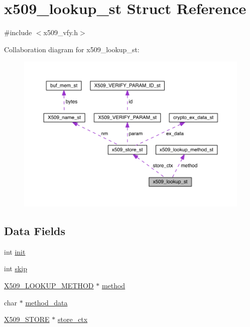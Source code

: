 \hypertarget{structx509__lookup__st}{}\section{x509\+\_\+lookup\+\_\+st Struct Reference}
\label{structx509__lookup__st}


{\ttfamily \#include $<$x509\+\_\+vfy.\+h$>$}



Collaboration diagram for x509\+\_\+lookup\+\_\+st\+:\nopagebreak
\begin{figure}[H]
\begin{center}
\leavevmode
\includegraphics[width=350pt]{structx509__lookup__st__coll__graph}
\end{center}
\end{figure}
\subsection*{Data Fields}
\begin{DoxyCompactItemize}
\item 
int \hyperlink{structx509__lookup__st_a795ea50921b36311ffd5e7baa2ef1f7e}{init}
\item 
int \hyperlink{structx509__lookup__st_a13f77b252237844d7b8b6e3c3047fe50}{skip}
\item 
\hyperlink{crypto_2x509_2x509__vfy_8h_a795687b9a64050138f299d19013fe29d}{X509\+\_\+\+L\+O\+O\+K\+U\+P\+\_\+\+M\+E\+T\+H\+OD} $\ast$ \hyperlink{structx509__lookup__st_a95febc2187ab802f9765b96d200372b2}{method}
\item 
char $\ast$ \hyperlink{structx509__lookup__st_a994ec3b2447e920106a794dde071ce24}{method\+\_\+data}
\item 
\hyperlink{crypto_2ossl__typ_8h_a3a2b800bae08729d11bc28f12b795597}{X509\+\_\+\+S\+T\+O\+RE} $\ast$ \hyperlink{structx509__lookup__st_ac02cd78c2c67fc42c895c939d4b332cb}{store\+\_\+ctx}
\end{DoxyCompactItemize}


